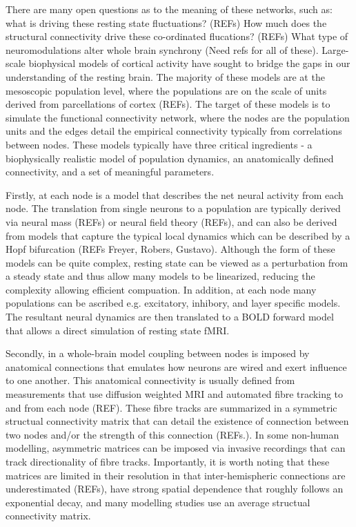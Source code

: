 \documentclass[oneside]{zHenriquesLab-StyleBioRxiv}
\begin{document}
There are many open questions as to the meaning of these networks, such as: what is driving these resting state fluctuations? (REFs) How much does the structural connectivity drive these co-ordinated flucations? (REFs) What type of neuromodulations alter whole brain synchrony (Need refs for all of these). Large-scale biophysical models of cortical activity have sought to bridge the gaps in our understanding of the resting brain. The majority of these models are at the mesoscopic population level, where the populations are on the scale of units derived from parcellations of cortex (REFs). The target of these models is to simulate the functional connectivity network, where the nodes are the population units and the edges detail the empirical connectivity typically from correlations between nodes. These models typically have three critical ingredients - a biophysically realistic model of population dynamics, an anatomically defined connectivity, and a set of meaningful parameters. 


Firstly, at each node is a model that describes the net neural activity from each node. The translation from single neurons to a population are typically derived via neural mass (REFs) or neural field theory (REFs), and can also be derived from models that capture the typical local dynamics which can be described by a Hopf bifurcation (REFs Freyer, Robers, Gustavo). Although the form of these models can be quite complex, resting state can be viewed as a perturbation from a steady state and thus allow many models to be linearized, reducing the complexity allowing efficient compuation. In addition, at each node many populations can be ascribed e.g. excitatory, inhibory, and layer specific models. The resultant neural dynamics are then translated to a BOLD forward model that allows a direct simulation of resting state fMRI.


Secondly, in a whole-brain model coupling between nodes is imposed by  anatomical connections that emulates how neurons are wired and exert influence to one another. This anatomical connectivity is usually defined from measurements that use diffusion weighted MRI and automated fibre tracking to and from each node (REF). These fibre tracks are summarized in a symmetric structual connectivity matrix that can detail the existence of connection between two nodes and/or the strength of this connection (REFs.). In some non-human modelling, asymmetric matrices can be imposed via invasive recordings that can track directionality of fibre tracks. Importantly, it is worth noting that these matrices are limited in their resolution in that inter-hemispheric connections are underestimated (REFs), have strong spatial dependence that roughly follows an exponential decay, and many modelling studies use an average structual connectivity matrix. 
\end{document}
